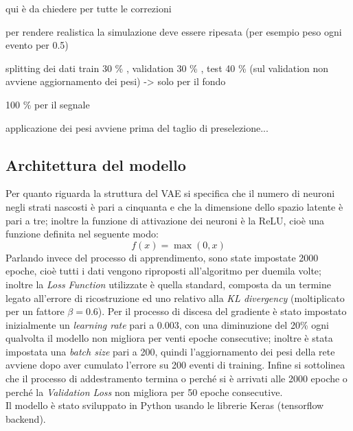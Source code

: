 \color{red}
qui è da chiedere per tutte le correzioni
\color{black}

\newpage



per rendere realistica la simulazione deve essere ripesata (per esempio peso ogni evento per 0.5)

splitting dei dati train 30 \% , validation 30 \% , test 40 \%
(sul validation non avviene aggiornamento dei pesi) -> solo per il fondo

100 \% per il segnale

applicazione dei pesi avviene prima del taglio di preselezione...



\subsection{Architettura del modello}
\label{architettura del modello}
Per quanto riguarda la struttura del VAE si specifica che il numero di neuroni negli strati nascosti è pari a cinquanta e che la dimensione dello spazio latente è pari a tre; inoltre la funzione di attivazione dei neuroni è la ReLU, cioè una funzione definita nel seguente modo:
\begin{equation}
	f(x) = \max(0,x)
\end{equation} 
Parlando invece del processo di apprendimento, sono state impostate 2000 epoche, cioè tutti i dati vengono riproposti all'algoritmo per duemila volte; inoltre la \textit{Loss Function} utilizzate è quella standard, composta da un termine legato all'errore di ricostruzione ed uno relativo alla \textit{KL divergency} (moltiplicato per un fattore $\beta=0.6$). Per il processo di discesa del gradiente è stato impostato inizialmente un \textit{learning rate} pari a 0.003, con una diminuzione del 20\% ogni qualvolta il modello non migliora per venti epoche consecutive; inoltre è stata impostata una \textit{batch size} pari a 200, quindi l'aggiornamento dei pesi della rete avviene dopo aver cumulato l'errore su 200 eventi di training. Infine si sottolinea che il processo di addestramento termina o perché si è arrivati alle 2000 epoche o perché la \textit{Validation Loss} non migliora per 50 epoche consecutive.\\
Il modello è stato sviluppato in Python usando le librerie Keras (tensorflow backend).



